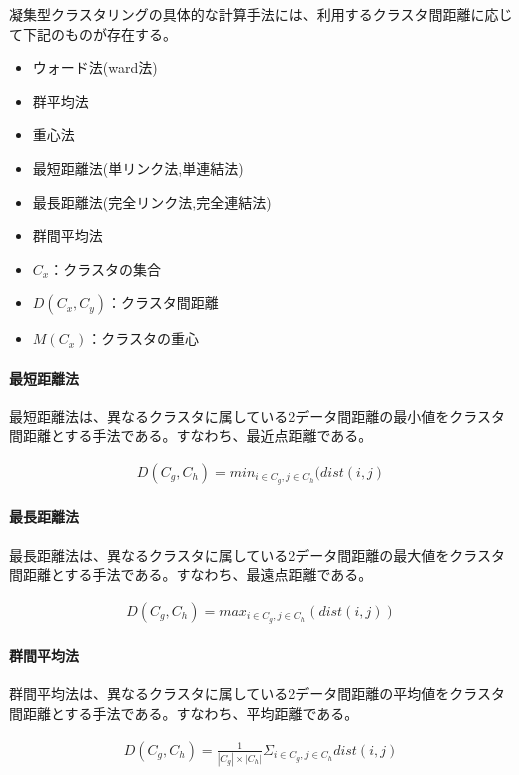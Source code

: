\documentclass[dvipdfmx]{jsarticle}
\begin{document}
凝集型クラスタリングの具体的な計算手法には、利用するクラスタ間距離に応じて下記のものが存在する。
\begin{itemize}
  \item ウォード法(ward法)
  \item 群平均法
  \item 重心法
  \item 最短距離法(単リンク法,単連結法)
  \item 最長距離法(完全リンク法,完全連結法)
  \item 群間平均法
\end{itemize}
\begin{itemize}
  \item $C_{x}$：クラスタの集合
  \item $D(C_{x}, C_{y})$：クラスタ間距離
  \item $M(C_{x})$：クラスタの重心
\end{itemize}
\paragraph{最短距離法}
最短距離法は、異なるクラスタに属している2データ間距離の最小値をクラスタ間距離とする手法である。すなわち、最近点距離である。
\begin{center}
\begin{eqnarray*}
    D(C_{g}, C_{h}) = min_{i \in C_{g}, j \in C_{h}}(dist(i, j)
\end{eqnarray*}
\end{center}
\paragraph{最長距離法}
最長距離法は、異なるクラスタに属している2データ間距離の最大値をクラスタ間距離とする手法である。すなわち、最遠点距離である。
\begin{center}
  \begin{eqnarray*}
    D(C_{g}, C_{h}) = max_{i \in C_{g}, j \in C_{h}}(dist(i, j))
  \end{eqnarray*}
\end{center}
\paragraph{群間平均法}
群間平均法は、異なるクラスタに属している2データ間距離の平均値をクラスタ間距離とする手法である。すなわち、平均距離である。
\begin{center}
  \begin{eqnarray*}
    D(C_{g}, C_{h}) = \frac{1}{|C_{g}|\times |C_{h}|}\Sigma_{i \in C_{g}, j \in C_{h}}dist(i,j)
  \end{eqnarray*}
\end{center}
\end{document}
